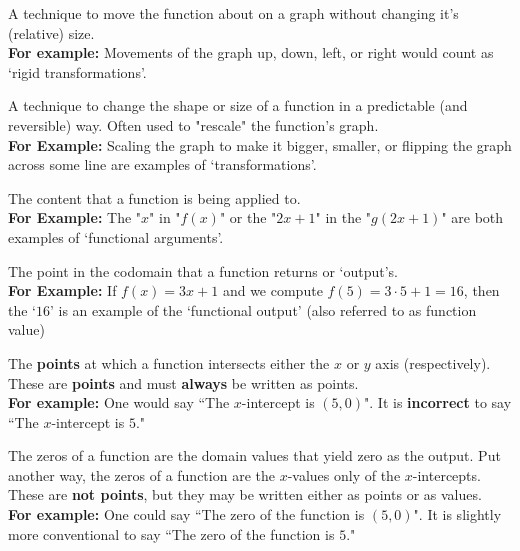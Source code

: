 \documentclass{ximera}
\begin{document}
\begin{definition}
    A technique to move the function about on a graph without changing it's (relative) size. \\
    \textbf{For example:} Movements of the graph up, down, left, or right would count as `rigid transformations'.
\end{definition}

\begin{definition}[Transformation]
    A technique to change the shape or size of a function in a predictable (and reversible) way. Often used to "rescale" the function's graph.\\
    \textbf{For Example:} Scaling the graph to make it bigger, smaller, or flipping the graph across some line are examples of `transformations'.
\end{definition}

\begin{definition}
    The content that a function is being applied to.\\
    \textbf{For Example:} The "$x$" in "$f(x)$" or the "$2x+1$" in the "$g(2x+1)$" are both examples of `functional arguments'.
\end{definition}

\begin{definition}
    The point in the codomain that a function returns or `output's.\\
    \textbf{For Example:} If $f(x) = 3x+1$ and we compute $f(5) = 3\cdot5 + 1 = 16$, then the `$16$' is an example of the `functional output' (also referred to as function value)
\end{definition}

\begin{definition}[(x or y) intercept(s)]
    The \textbf{points} at which a function intersects either the $x$ or $y$ axis (respectively). These are \textbf{points} and must \textbf{always} be written as points. \\
    \textbf{For example:} One would say ``The $x$-intercept is $(5,0)$". It is \textbf{incorrect} to say ``The $x$-intercept is $5$."
\end{definition}

\begin{definition}
    The zeros of a function are the domain values that yield zero as the output. Put another way, the zeros of a function are the $x$-values only of the $x$-intercepts. These are \textbf{not points}, but they may be written either as points or as values.\\
    \textbf{For example:} One could say ``The zero of the function is $(5,0)$". It is slightly more conventional to say ``The zero of the function is $5$."
\end{definition}
\end{document}
